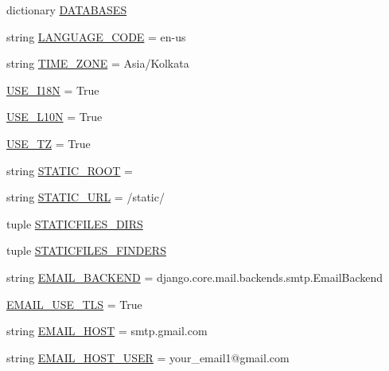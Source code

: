 \begin{DoxyCompactItemize}
\item 
dictionary \hyperlink{namespacesage_1_1settings_a870c10acdd1141ac92340ce3e50ffbbd}{D\+A\+T\+A\+B\+A\+S\+E\+S}
\item 
string \hyperlink{namespacesage_1_1settings_ac5b7a49ef37a25508ecb84453063821a}{L\+A\+N\+G\+U\+A\+G\+E\+\_\+\+C\+O\+D\+E} = \textquotesingle{}en-\/us\textquotesingle{}
\item 
string \hyperlink{namespacesage_1_1settings_a07421ef620becc4c93753901abdf83c0}{T\+I\+M\+E\+\_\+\+Z\+O\+N\+E} = \textquotesingle{}Asia/Kolkata\textquotesingle{}
\item 
\hyperlink{namespacesage_1_1settings_acf5dd02a352695a98f57bef7679a29af}{U\+S\+E\+\_\+\+I18\+N} = True
\item 
\hyperlink{namespacesage_1_1settings_a9d0e7298d4688c99e0ee9e965d950de0}{U\+S\+E\+\_\+\+L10\+N} = True
\item 
\hyperlink{namespacesage_1_1settings_aa385f778cd7bd79cc4c688fec7c101a2}{U\+S\+E\+\_\+\+T\+Z} = True
\item 
string \hyperlink{namespacesage_1_1settings_a91b967847aecdd4d0edfbb0229656929}{S\+T\+A\+T\+I\+C\+\_\+\+R\+O\+O\+T} = \textquotesingle{}\textquotesingle{}
\item 
string \hyperlink{namespacesage_1_1settings_a0b4647cdde23eaed09c255182a9f576c}{S\+T\+A\+T\+I\+C\+\_\+\+U\+R\+L} = \textquotesingle{}/static/\textquotesingle{}
\item 
tuple \hyperlink{namespacesage_1_1settings_ac4ae870dea0d58410747ddcbdff2b3d7}{S\+T\+A\+T\+I\+C\+F\+I\+L\+E\+S\+\_\+\+D\+I\+R\+S}
\item 
tuple \hyperlink{namespacesage_1_1settings_af629022b1da961fa9828f450bc80bd22}{S\+T\+A\+T\+I\+C\+F\+I\+L\+E\+S\+\_\+\+F\+I\+N\+D\+E\+R\+S}
\item 
string \hyperlink{namespacesage_1_1settings_a2d83ca0a279480aa03599465a0386b17}{E\+M\+A\+I\+L\+\_\+\+B\+A\+C\+K\+E\+N\+D} = \textquotesingle{}django.\+core.\+mail.\+backends.\+smtp.\+Email\+Backend\textquotesingle{}
\item 
\hyperlink{namespacesage_1_1settings_a0fe7c4174cb1b7d03f7b574ae1e5eed9}{E\+M\+A\+I\+L\+\_\+\+U\+S\+E\+\_\+\+T\+L\+S} = True
\item 
string \hyperlink{namespacesage_1_1settings_a594329fe15c9680f523afaab779411ed}{E\+M\+A\+I\+L\+\_\+\+H\+O\+S\+T} = \textquotesingle{}smtp.\+gmail.\+com\textquotesingle{}
\item 
string \hyperlink{namespacesage_1_1settings_a9c01855359753a3c3f517341806347c2}{E\+M\+A\+I\+L\+\_\+\+H\+O\+S\+T\+\_\+\+U\+S\+E\+R} = \textquotesingle{}your\+\_\+email1@gmail.\+com\textquotesingle{}

\end{DoxyCompactItemize}
